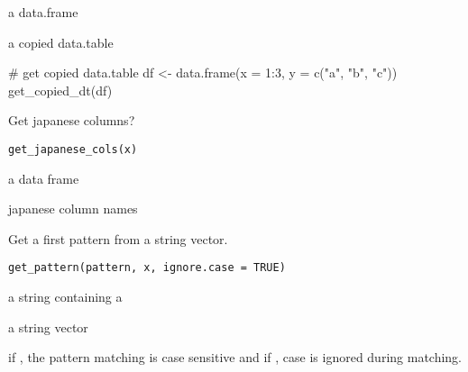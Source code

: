 \documentclass[letterpaper]{book}
\begin{document}
%
\begin{Arguments}
\begin{ldescription}
\item[\code{df}] a data.frame
\end{ldescription}
\end{Arguments}
%
\begin{Value}
a copied data.table
\end{Value}
%
\begin{Examples}
\begin{ExampleCode}
# get copied data.table
df <- data.frame(x = 1:3, y = c("a", "b", "c"))
get_copied_dt(df)

\end{ExampleCode}
\end{Examples}
%
\begin{Description}
Get japanese columns?
\end{Description}
%
\begin{Usage}
\begin{verbatim}
get_japanese_cols(x)
\end{verbatim}
\end{Usage}
%
\begin{Arguments}
\begin{ldescription}
\item[\code{x}] a data frame
\end{ldescription}
\end{Arguments}
%
\begin{Value}
japanese column names
\end{Value}
%
\begin{Description}
Get a first pattern from a string vector.
\end{Description}
%
\begin{Usage}
\begin{verbatim}
get_pattern(pattern, x, ignore.case = TRUE)
\end{verbatim}
\end{Usage}
%
\begin{Arguments}
\begin{ldescription}
\item[\code{pattern}] a string containing a 

\item[\code{x}] a string vector

\item[\code{ignore.case}] if , the pattern matching is case sensitive and if , case is ignored during matching.
\end{ldescription}
\end{Arguments}
\end{document}
